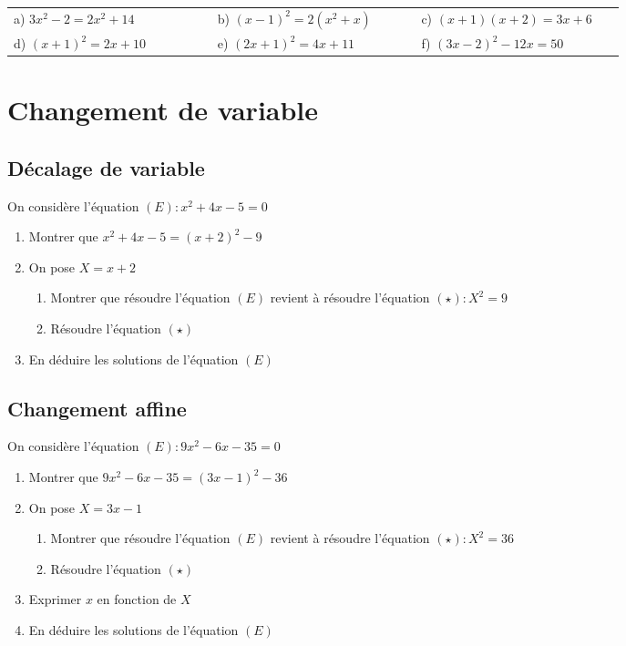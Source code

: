 \documentclass[oneside,12pt]{article}          %
\begin{document}
\begin{tabular}{p{0.3\linewidth} p{0.3\linewidth} p{0.3\linewidth}}
	a) $3x^2-2=2x^2+14$ & b) $(x-1)^2=2(x^2+x)$ & c) $(x+1)(x+2)=3x+6$ \\
	d) $(x+1)^2=2x+10$ & e) $(2x+1)^2=4x+11$ & f) $(3x-2)^2-12x=50$
\end{tabular}




\section{Changement de variable}

\subsection{Décalage de variable}
On considère l'équation $(E):x^2+4x-5=0$
\begin{enumerate}
	\item Montrer que $x^2+4x-5=(x+2)^2-9$
	\item On pose $X=x+2$
	\begin{enumerate}
		\item Montrer que résoudre l'équation $(E)$ revient à résoudre l'équation $(\star):X^2=9$
		\item Résoudre l'équation $(\star)$
	\end{enumerate}
	\item En déduire les solutions de l'équation $(E)$
\end{enumerate}



\subsection{Changement affine}
On considère l'équation $(E):9x^2-6x-35=0$
\begin{enumerate}
	\item Montrer que $9x^2-6x-35=(3x-1)^2-36$
	\item On pose $X=3x-1$
	\begin{enumerate}
		\item Montrer que résoudre l'équation $(E)$ revient à résoudre l'équation $(\star):X^2=36$
		\item Résoudre l'équation $(\star)$
	\end{enumerate}
	\item Exprimer $x$ en fonction de $X$
	\item En déduire les solutions de l'équation $(E)$
\end{enumerate}
\end{document}
